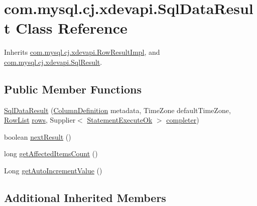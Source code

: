 \hypertarget{classcom_1_1mysql_1_1cj_1_1xdevapi_1_1_sql_data_result}{}\section{com.\+mysql.\+cj.\+xdevapi.\+Sql\+Data\+Result Class Reference}
\label{classcom_1_1mysql_1_1cj_1_1xdevapi_1_1_sql_data_result}


Inherits \mbox{\hyperlink{classcom_1_1mysql_1_1cj_1_1xdevapi_1_1_row_result_impl}{com.\+mysql.\+cj.\+xdevapi.\+Row\+Result\+Impl}}, and \mbox{\hyperlink{interfacecom_1_1mysql_1_1cj_1_1xdevapi_1_1_sql_result}{com.\+mysql.\+cj.\+xdevapi.\+Sql\+Result}}.

\subsection*{Public Member Functions}
\begin{DoxyCompactItemize}
\item 
\mbox{\hyperlink{classcom_1_1mysql_1_1cj_1_1xdevapi_1_1_sql_data_result_a093eac6f7bdb99d8f0130150171231dc}{Sql\+Data\+Result}} (\mbox{\hyperlink{interfacecom_1_1mysql_1_1cj_1_1protocol_1_1_column_definition}{Column\+Definition}} metadata, Time\+Zone default\+Time\+Zone, \mbox{\hyperlink{interfacecom_1_1mysql_1_1cj_1_1result_1_1_row_list}{Row\+List}} \mbox{\hyperlink{classcom_1_1mysql_1_1cj_1_1xdevapi_1_1_abstract_data_result_ae04b2bf0af10423f89abe996549946f9}{rows}}, Supplier$<$ \mbox{\hyperlink{classcom_1_1mysql_1_1cj_1_1protocol_1_1x_1_1_statement_execute_ok}{Statement\+Execute\+Ok}} $>$ \mbox{\hyperlink{classcom_1_1mysql_1_1cj_1_1xdevapi_1_1_abstract_data_result_aec36caa2d5404a5748add97ebab8bc1e}{completer}})
\item 
boolean \mbox{\hyperlink{classcom_1_1mysql_1_1cj_1_1xdevapi_1_1_sql_data_result_a4dc2d012228a58a9ebe74f93f9a007a9}{next\+Result}} ()
\item 
long \mbox{\hyperlink{classcom_1_1mysql_1_1cj_1_1xdevapi_1_1_sql_data_result_a84d9f2a000e9babce642708126dbb124}{get\+Affected\+Items\+Count}} ()
\item 
Long \mbox{\hyperlink{classcom_1_1mysql_1_1cj_1_1xdevapi_1_1_sql_data_result_aa6d3e3de7bb565c7086d71b0242c77d9}{get\+Auto\+Increment\+Value}} ()
\end{DoxyCompactItemize}
\subsection*{Additional Inherited Members}


